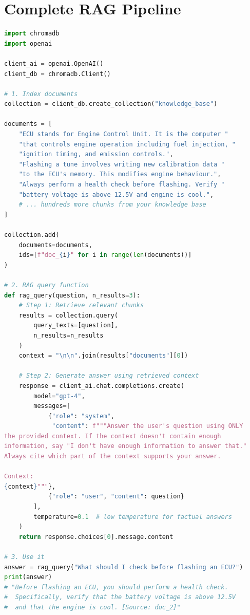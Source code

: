 \documentclass[12pt, a4paper, oneside]{book}
\begin{document}
\section{Complete RAG Pipeline}

\begin{lstlisting}[language=Python, caption={Production RAG pipeline}]
import chromadb
import openai

client_ai = openai.OpenAI()
client_db = chromadb.Client()

# 1. Index documents
collection = client_db.create_collection("knowledge_base")

documents = [
    "ECU stands for Engine Control Unit. It is the computer "
    "that controls engine operation including fuel injection, "
    "ignition timing, and emission controls.",
    "Flashing a tune involves writing new calibration data "
    "to the ECU's memory. This modifies engine behaviour.",
    "Always perform a health check before flashing. Verify "
    "battery voltage is above 12.5V and engine is cool.",
    # ... hundreds more chunks from your knowledge base
]

collection.add(
    documents=documents,
    ids=[f"doc_{i}" for i in range(len(documents))]
)

# 2. RAG query function
def rag_query(question, n_results=3):
    # Step 1: Retrieve relevant chunks
    results = collection.query(
        query_texts=[question],
        n_results=n_results
    )
    context = "\n\n".join(results["documents"][0])

    # Step 2: Generate answer using retrieved context
    response = client_ai.chat.completions.create(
        model="gpt-4",
        messages=[
            {"role": "system",
             "content": f"""Answer the user's question using ONLY
the provided context. If the context doesn't contain enough
information, say "I don't have enough information to answer that."
Always cite which part of the context supports your answer.

Context:
{context}"""},
            {"role": "user", "content": question}
        ],
        temperature=0.1  # low temperature for factual answers
    )
    return response.choices[0].message.content

# 3. Use it
answer = rag_query("What should I check before flashing an ECU?")
print(answer)
# "Before flashing an ECU, you should perform a health check.
#  Specifically, verify that the battery voltage is above 12.5V
#  and that the engine is cool. [Source: doc_2]"
\end{lstlisting}
\end{document}
